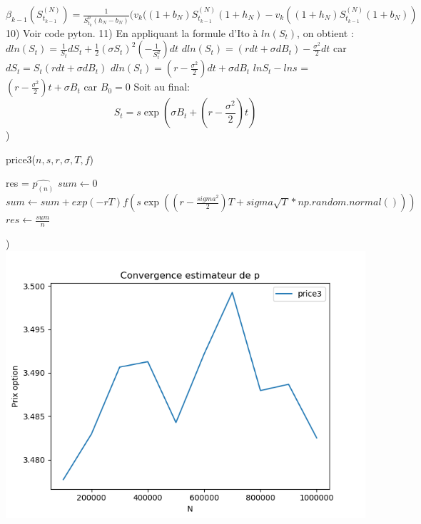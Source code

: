 \documentclass{exam}
\begin{document}
$\beta_{k-1}(S_{t_{k-1}}^{(N)})=\frac{1}{S_{t_k}^0(h_N-b_N)}(v_k((1+b_N)S_{t_{k-1}}^{(N)}(1+h_N)-v_k((1+h_N)S_{t_{k-1}}^{(N)}(1+b_N))$
\newline
\vspace{0.5cm}
10) Voir code pyton.
\newline
\vspace{0.5cm}
11) En appliquant la formule d'Ito à $ln (S_t)$, on obtient :
\newline
\espace
$dln(S_t)=\frac{1}{S_t}dS_t + \frac{1}{2}(\sigma S_t)^{2}(-\frac{1}{S_t^{2}})dt$  
\newline
\espace
\Longleftrightarrow \hspace{0.5cm} $dln(S_t)=(r dt + \sigma dB_t)-\frac{\sigma^{2}}{2} dt$ \hspace{0.5cm} car \hspace{0.5cm} $dS_t=S_t(rdt + \sigma dB_t)$
\newline
\espace
\Longleftrightarrow \hspace{0.5cm} $dln(S_t)=(r-\frac{\sigma^2}{2})dt + \sigma dB_t$
\newline
\espace
\Longleftrightarrow \hspace{0.5cm} $lnS_t - lns$ = $(r-\frac{\sigma^2}{2})t + \sigma B_t$ \hspace{0.5cm} car $B_0=0$
\newline
\espace
Soit au final:
\newline
\espace
$$\boxed{S_t=s \exp{(\sigma B_t + (r-\frac{\sigma^2}{2})t)}}$$
\newline
{})
\begin{algorithm}
\caption{price3($n,s,r,\sigma,T,f$)}
\begin{algorithmic}
\ENSURE res = $\hat{p_{(n)}}$
\STATE $sum \leftarrow 0$
\STATE $sum \leftarrow sum + exp(-rT)f(s\exp((r-\frac{sigma^2}{2})T+sigma \sqrt{T}*np.random.normal()))$
\STATE $res \leftarrow \frac{sum}{n}$
\ENDFOR
\end{algorithmic}
\end{algorithm}
\newline
{}) \includegraphics{question13.png}
\end{document}
